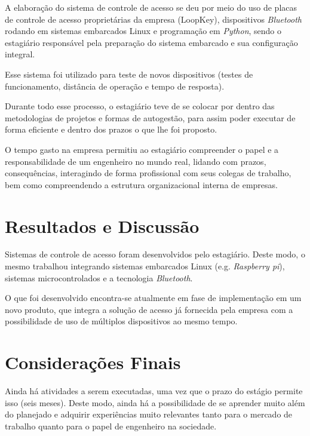 \documentclass[12pt,fleqn]{article}
\begin{document}
A elaboração do sistema de controle de acesso se deu por meio do uso de placas de controle de acesso proprietárias da empresa (LoopKey),
dispositivos \textit{Bluetooth} rodando em  sistemas embarcados Linux e programação em \textit{Python}, sendo o estagiário
responsável pela preparação do sistema embarcado e sua configuração integral. 

Esse sistema foi utilizado para teste de novos dispositivos (testes de funcionamento, distância de operação e tempo 
de resposta).

Durante todo esse processo, o estagiário teve de se colocar por dentro das metodologias de projetos e formas de autogestão,
para assim poder executar de forma eficiente e dentro dos prazos o que lhe foi proposto.

O tempo gasto na empresa permitiu ao estagiário compreender o papel e a responsabilidade de um engenheiro no mundo real, lidando
com prazos, consequências, interagindo de forma profissional com seus colegas de trabalho,
bem como compreendendo a estrutura organizacional interna de empresas.

\newpage
\section{Resultados e Discussão}

 \hspace*{1.25cm} Sistemas de controle de acesso foram desenvolvidos pelo estagiário. 
 Deste modo, o mesmo trabalhou integrando sistemas embarcados Linux (e.g. \textit{Raspberry pi}), 
 sistemas microcontrolados e a tecnologia \textit{Bluetooth}. 

 O que foi desenvolvido encontra-se atualmente em fase de implementação em um novo produto, que integra a solução 
 de acesso já fornecida pela empresa com a possibilidade de uso de múltiplos dispositivos ao mesmo tempo. 

\section{Considerações Finais}
\hspace*{1.25cm} Ainda há atividades a serem executadas, uma vez que o prazo do estágio 
permite isso (seis meses). Deste modo, ainda há a possibilidade de se aprender muito além do planejado e adquirir experiências
muito relevantes tanto para o mercado de trabalho quanto para o papel de engenheiro na sociedade.


%

\end{document}
